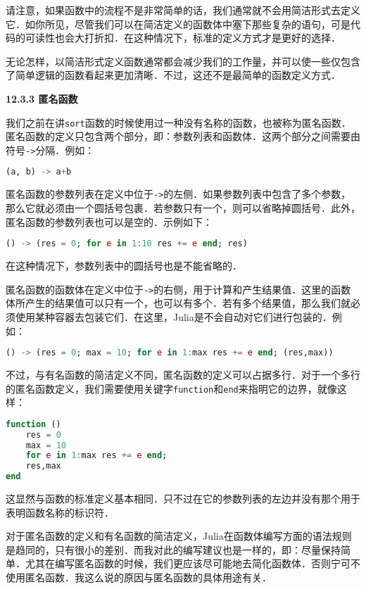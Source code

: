 请注意，如果函数中的流程不是非常简单的话，我们通常就不会用简洁形式去定义它．如你所见，尽管我们可以在简洁定义的函数体中塞下那些复杂的语句，可是代码的可读性也会大打折扣．在这种情况下，标准的定义方式才是更好的选择．

无论怎样，以简洁形式定义函数通常都会减少我们的工作量，并可以使一些仅包含了简单逻辑的函数看起来更加清晰．不过，这还不是最简单的函数定义方式．

\textbf{12.3.3 匿名函数}

我们之前在讲\verb|sort|函数的时候使用过一种没有名称的函数，也被称为匿名函数．匿名函数的定义只包含两个部分，即：参数列表和函数体．这两个部分之间需要由符号\verb|->|分隔．例如：

\begin{lstlisting}[language=julia]
(a, b) -> a+b
\end{lstlisting}

匿名函数的参数列表在定义中位于\verb|->|的左侧．如果参数列表中包含了多个参数，那么它就必须由一个圆括号包裹．若参数只有一个，则可以省略掉圆括号．此外，匿名函数的参数列表也可以是空的．示例如下：

\begin{lstlisting}[language=julia]
() -> (res = 0; for e in 1:10 res += e end; res)
\end{lstlisting}

在这种情况下，参数列表中的圆括号也是不能省略的．

匿名函数的函数体在定义中位于\verb|->|的右侧，用于计算和产生结果值．这里的函数体所产生的结果值可以只有一个，也可以有多个．若有多个结果值，那么我们就必须使用某种容器去包装它们．在这里，Julia是不会自动对它们进行包装的．例如：

\begin{lstlisting}[language=julia]
() -> (res = 0; max = 10; for e in 1:max res += e end; (res,max))
\end{lstlisting}

不过，与有名函数的简洁定义不同，匿名函数的定义可以占据多行．对于一个多行的匿名函数定义，我们需要使用关键字\verb|function|和\verb|end|来指明它的边界，就像这样：

\begin{lstlisting}[language=julia]
function ()
    res = 0
    max = 10
    for e in 1:max res += e end;
    res,max
end
\end{lstlisting}

这显然与函数的标准定义基本相同．只不过在它的参数列表的左边并没有那个用于表明函数名称的标识符．

对于匿名函数的定义和有名函数的简洁定义，Julia在函数体编写方面的语法规则是趋同的，只有很小的差别．而我对此的编写建议也是一样的，即：尽量保持简单．尤其在编写匿名函数的时候，我们更应该尽可能地去简化函数体．否则宁可不使用匿名函数．我这么说的原因与匿名函数的具体用途有关．

